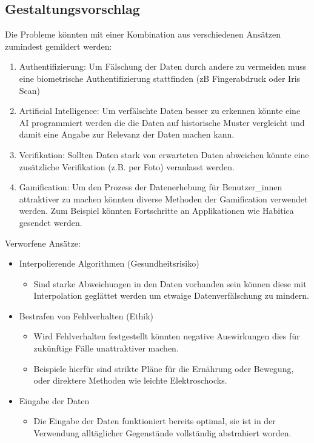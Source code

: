 \subsection{Gestaltungsvorschlag}
Die Probleme könnten mit einer Kombination aus verschiedenen Ansätzen zumindest gemildert werden: 
\begin{enumerate}
	\item Authentifizierung: Um Fälschung der Daten durch andere zu vermeiden muss eine biometrische Authentifizierung stattfinden (zB Fingerabdruck oder Iris Scan) 
	\item Artificial Intelligence: Um verfälschte Daten besser zu erkennen könnte eine AI programmiert werden die die Daten auf historische Muster vergleicht und damit eine Angabe zur Relevanz der Daten machen kann.
	\item Verifikation: Sollten Daten stark von erwarteten Daten abweichen könnte eine zusätzliche Verifikation (z.B. per Foto) veranlasst werden. 
	\item Gamification\cite{gameDesignElements}: Um den Prozess der Datenerhebung für Benutzer\_innen attraktiver zu machen könnten diverse Methoden der Gamification verwendet werden. Zum Beispiel könnten Fortschritte an Applikationen wie Habitica\cite{habitica} gesendet werden.
\end{enumerate}

Verworfene Ansätze:
\begin{itemize}
	\item Interpolierende Algorithmen (Gesundheitsrisiko)
	\begin{itemize}
		\item Sind starke Abweichungen in den Daten vorhanden sein können diese mit Interpolation geglättet werden um etwaige Datenverfälschung zu mindern.
	\end{itemize}

	\item Bestrafen von Fehlverhalten (Ethik)
	\begin{itemize}
		\item Wird Fehlverhalten festgestellt könnten negative Auswirkungen dies für zukünftige Fälle unattraktiver machen.
		\item Beispiele hierfür sind strikte Pläne für die Ernährung oder Bewegung, oder direktere Methoden wie leichte Elektroschocks. 
	\end{itemize}

	\item Eingabe der Daten
	\begin{itemize}
		\item Die Eingabe der Daten funktioniert bereits optimal, sie ist in der Verwendung alltäglicher Gegenstände vollständig abstrahiert worden. 
	\end{itemize}
\end{itemize}
